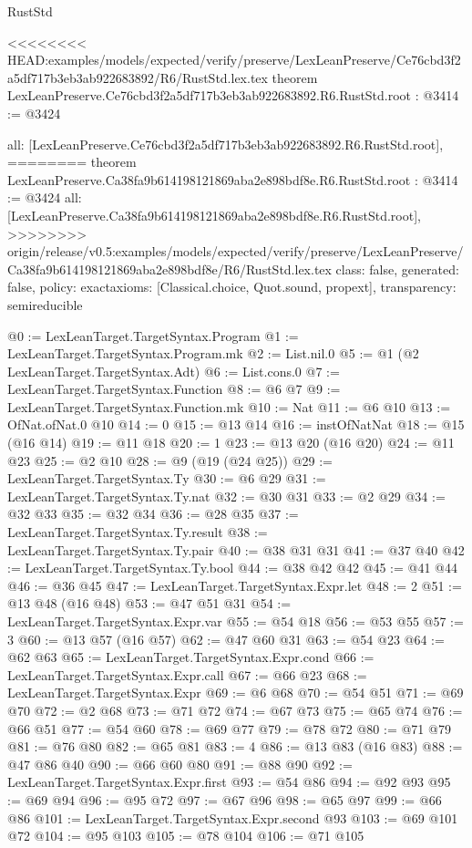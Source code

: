 \begin{lexlean}{RustStd}
\begin{coremodule}
{\begin{coremodule}
{{{{{{{{{{}
<<<<<<<< HEAD:examples/models/expected/verify/preserve/LexLeanPreserve/Ce76cbd3f2a5df717b3eb3ab922683892/R6/RustStd.lex.tex
theorem LexLeanPreserve.Ce76cbd3f2a5df717b3eb3ab922683892.R6.RustStd.root : @3414 := @3424 {
  all: [LexLeanPreserve.Ce76cbd3f2a5df717b3eb3ab922683892.R6.RustStd.root],
========
theorem LexLeanPreserve.Ca38fa9b614198121869aba2e898bdf8e.R6.RustStd.root : @3414 := @3424 {
  all: [LexLeanPreserve.Ca38fa9b614198121869aba2e898bdf8e.R6.RustStd.root],
>>>>>>>> origin/release/v0.5:examples/models/expected/verify/preserve/LexLeanPreserve/Ca38fa9b614198121869aba2e898bdf8e/R6/RustStd.lex.tex
  class: false,
  generated: false,
  policy: exact{axioms: [Classical.choice, Quot.sound, propext]},
  transparency: semireducible
}

@0 := LexLeanTarget.TargetSyntax.Program
@1 := LexLeanTarget.TargetSyntax.Program.mk
@2 := List.nil.{0}
@5 := @1 (@2 LexLeanTarget.TargetSyntax.Adt)
@6 := List.cons.{0}
@7 := LexLeanTarget.TargetSyntax.Function
@8 := @6 @7
@9 := LexLeanTarget.TargetSyntax.Function.mk
@10 := Nat
@11 := @6 @10
@13 := OfNat.ofNat.{0} @10
@14 := 0
@15 := @13 @14
@16 := instOfNatNat
@18 := @15 (@16 @14)
@19 := @11 @18
@20 := 1
@23 := @13 @20 (@16 @20)
@24 := @11 @23
@25 := @2 @10
@28 := @9 (@19 (@24 @25))
@29 := LexLeanTarget.TargetSyntax.Ty
@30 := @6 @29
@31 := LexLeanTarget.TargetSyntax.Ty.nat
@32 := @30 @31
@33 := @2 @29
@34 := @32 @33
@35 := @32 @34
@36 := @28 @35
@37 := LexLeanTarget.TargetSyntax.Ty.result
@38 := LexLeanTarget.TargetSyntax.Ty.pair
@40 := @38 @31 @31
@41 := @37 @40
@42 := LexLeanTarget.TargetSyntax.Ty.bool
@44 := @38 @42 @42
@45 := @41 @44
@46 := @36 @45
@47 := LexLeanTarget.TargetSyntax.Expr.let
@48 := 2
@51 := @13 @48 (@16 @48)
@53 := @47 @51 @31
@54 := LexLeanTarget.TargetSyntax.Expr.var
@55 := @54 @18
@56 := @53 @55
@57 := 3
@60 := @13 @57 (@16 @57)
@62 := @47 @60 @31
@63 := @54 @23
@64 := @62 @63
@65 := LexLeanTarget.TargetSyntax.Expr.cond
@66 := LexLeanTarget.TargetSyntax.Expr.call
@67 := @66 @23
@68 := LexLeanTarget.TargetSyntax.Expr
@69 := @6 @68
@70 := @54 @51
@71 := @69 @70
@72 := @2 @68
@73 := @71 @72
@74 := @67 @73
@75 := @65 @74
@76 := @66 @51
@77 := @54 @60
@78 := @69 @77
@79 := @78 @72
@80 := @71 @79
@81 := @76 @80
@82 := @65 @81
@83 := 4
@86 := @13 @83 (@16 @83)
@88 := @47 @86 @40
@90 := @66 @60 @80
@91 := @88 @90
@92 := LexLeanTarget.TargetSyntax.Expr.first
@93 := @54 @86
@94 := @92 @93
@95 := @69 @94
@96 := @95 @72
@97 := @67 @96
@98 := @65 @97
@99 := @66 @86
@101 := LexLeanTarget.TargetSyntax.Expr.second @93
@103 := @69 @101 @72
@104 := @95 @103
@105 := @78 @104
@106 := @71 @105
}}}}}}}}}}
\end{coremodule}}
\end{coremodule}
\end{lexlean}
